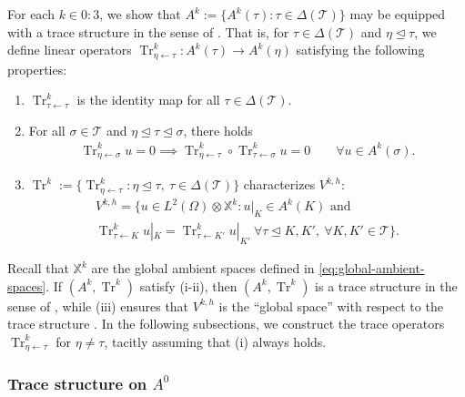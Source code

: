 \documentclass{mcom-l}
\theoremstyle{definition}
\theoremstyle{remark}
\numberwithin{equation}{section}
\DeclareMathOperator{\from}{\leftarrow}
\DeclareMathOperator{\Tr}{Tr}
\DeclareMathOperator{\subsimplex}{\unlhd}
\newcommand{\mesh}[0]{\mathcal{T}}
\begin{document}
For each $k \in 0:3$, we  
show that $A^k := \{ A^k(\tau) : \tau \in \Delta(\mesh) \}$
may be equipped with a trace structure in the sense of 
\cite[Definition 2.1]{HuLiangLin25}.
That is, for $\tau \in \Delta(\mesh)$ and $\eta \subsimplex \tau$,
we define linear operators 
$\Tr^k_{\eta \from \tau} : A^k(\tau) \to A^k(\eta)$ satisfying the 
following properties:
\begin{enumerate}
	\item[(i)] $\Tr^k_{\tau \from \tau}$ is the identity map for all 
	$\tau \in \Delta(\mesh)$.
	
	\item[(ii)] For all $\sigma \in \mesh$ and 
	$\eta \subsimplex \tau \subsimplex \sigma$, there holds 
	\begin{align}
		\label{eq:trace-vanishing-composition}
		\Tr^k_{\eta \from \sigma} u = 0 \implies 
		\Tr^k_{\eta \from \tau} \circ \Tr^k_{\tau \from \sigma} u = 0
		\qquad \forall u \in A^k(\sigma).
	\end{align}
	
	\item[(iii)] $\Tr^k := \{ \Tr^k_{\eta \from \tau} 
	: \eta \subsimplex \tau, \ \tau \in \Delta(\mesh) \}$
	characterizes $V^{k, h}$:
	\begin{multline}
		\label{eq:trace-characterizes-space}
		V^{k, h} = \{ u \in L^2(\Omega) \otimes \mathbb{X}^k : 
		u|_{K} \in A^k(K) \text{ and } \\
		\Tr^k_{\tau \from K} u|_{K} = \Tr^k_{\tau \from K'} u|_{K'} 
		\ \forall \tau \subsimplex K, K', 
		\ \forall K, K' \in \mesh\}.		
	\end{multline}
\end{enumerate}
Recall that $\mathbb{X}^k$ are the global ambient spaces 
defined in \cref{eq:global-ambient-spaces}.
If $(A^k, \Tr^k)$ satisfy (i-ii), then $(A^k, \Tr^k)$ is a trace structure 
in the sense of \cite[Definition 2.1]{HuLiangLin25}, while (iii)
ensures that $V^{k, h}$ is the ``global space'' with respect to 
the trace structure \cite[Definition 2.2]{HuLiangLin25}. In the following 
subsections, we construct the trace operators $\Tr^k_{\eta \from \tau}$ for 
$\eta \neq \tau$, tacitly assuming that (i) always holds.

\subsubsection{Trace structure on $A^0$}
\end{document}
